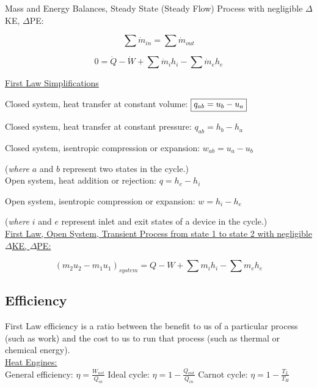 \documentclass[10pt]{article}
\begin{document}
\noindent
Mass and Energy Balances, Steady State (Steady Flow) Process with negligible $\Delta$KE, $\Delta$PE:

$$\sum \dot{m}_{in} = \sum \dot{m}_{out}$$

$$0  = \dot Q - \dot W + \sum \dot{m}_{i}h_{i} -\sum \dot{m}_{e}h_{e}$$

\smallskip

\noindent
\underline{First Law Simplifications}

Closed system, heat transfer at constant volume: \hspace{0.25cm} $\boxed{$$q_{ab}=u_b-u_a}$

Closed system, heat transfer at constant pressure: \hspace{0.25cm} $\boxed{q_{ab}=h_b-h_a}$

Closed system, isentropic compression or expansion: \hspace{0.25cm} $\boxed{w_{ab}=u_a-u_b}$

(\textit{where} $a$ and $b$ represent two states in the cycle.)\\

Open system, heat addition or rejection: \hspace{0.25cm} $\boxed{q=h_e-h_i}$

Open system, isentropic compression or expansion: \hspace{0.25cm} $\boxed{w=h_i-h_e}$

(\textit{where} $i$ and $e$ represent inlet and exit states of a device in the cycle.)\\


\noindent
\underline{First Law, Open System, Transient Process from state 1 to state 2 with negligible $\Delta$KE, $\Delta$PE:}

$$(m_2u_2 - m_1u_1)_{system} = Q - W + \sum m_ih_i - \sum m_eh_e$$

\subsection{Efficiency}

First Law efficiency is a ratio between the benefit to us of a particular process (such as work) and the cost to us to run that process (such as thermal or chemical energy).\\

\noindent
\underline{Heat Engines:} \\
\noindent
General efficiency: $\eta = \frac{W_{net}}{Q_{in}}$ \hspace{0.5cm} Ideal cycle: $\eta = 1-\frac{Q_{out}}{Q_{in}}$ \hspace{0.5cm} Carnot cycle: $\eta = 1-\frac{T_L}{T_H}$
\end{document}

